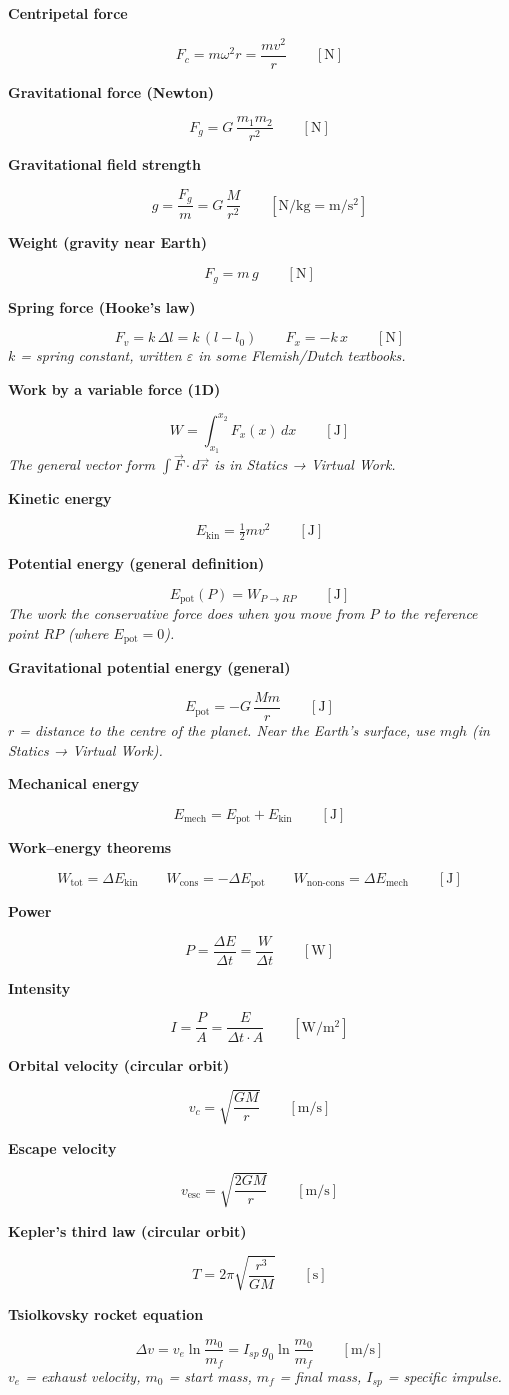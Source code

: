 \documentclass[11pt]{article}
\newcommand{\sub}[1]{\par\medskip\textbf{#1}\par}
\newcommand{\expl}[1]{{\color{gray}\itshape #1}\par}
\begin{document}
\sub{Centripetal force}
\[ F_c = m\omega^2 r = \frac{m v^2}{r} \qquad [\mathrm{N}] \]

\sub{Gravitational force (Newton)}
\[ F_g = G\,\frac{m_1 m_2}{r^2} \qquad [\mathrm{N}] \]

\sub{Gravitational field strength}
\[ g = \frac{F_g}{m} = G\,\frac{M}{r^2} \qquad [\mathrm{N/kg} = \mathrm{m/s^2}] \]

\sub{Weight (gravity near Earth)}
\[ F_g = m\,g \qquad [\mathrm{N}] \]

\sub{Spring force (Hooke's law)}
\[ F_v = k\,\Delta l = k\,(l - l_0) \qquad F_x = -k\,x \qquad [\mathrm{N}] \]
\expl{$k$ = spring constant, written $\varepsilon$ in some Flemish/Dutch textbooks.}

\sub{Work by a variable force (1D)}
\[ W = \int_{x_1}^{x_2} F_x(x)\,dx \qquad [\mathrm{J}] \]
\expl{The general vector form $\int \vec F \cdot d\vec r$ is in Statics → Virtual Work.}

\sub{Kinetic energy}
\[ E_{\text{kin}} = \tfrac{1}{2} m v^2 \qquad [\mathrm{J}] \]

\sub{Potential energy (general definition)}
\[ E_{\text{pot}}(P) = W_{P \to RP} \qquad [\mathrm{J}] \]
\expl{The work the conservative force does when you move from $P$ to the reference point $RP$ (where $E_{\text{pot}} = 0$).}

\sub{Gravitational potential energy (general)}
\[ E_{\text{pot}} = -G\,\frac{M m}{r} \qquad [\mathrm{J}] \]
\expl{$r$ = distance to the centre of the planet. Near the Earth's surface, use $mgh$ (in Statics → Virtual Work).}

\sub{Mechanical energy}
\[ E_{\text{mech}} = E_{\text{pot}} + E_{\text{kin}} \qquad [\mathrm{J}] \]

\sub{Work–energy theorems}
\[ W_{\text{tot}} = \Delta E_{\text{kin}} \qquad W_{\text{cons}} = -\Delta E_{\text{pot}} \qquad W_{\text{non-cons}} = \Delta E_{\text{mech}} \qquad [\mathrm{J}] \]

\sub{Power}
\[ P = \frac{\Delta E}{\Delta t} = \frac{W}{\Delta t} \qquad [\mathrm{W}] \]

\sub{Intensity}
\[ I = \frac{P}{A} = \frac{E}{\Delta t\cdot A} \qquad [\mathrm{W/m^2}] \]

\sub{Orbital velocity (circular orbit)}
\[ v_c = \sqrt{\frac{GM}{r}} \qquad [\mathrm{m/s}] \]

\sub{Escape velocity}
\[ v_{\text{esc}} = \sqrt{\frac{2GM}{r}} \qquad [\mathrm{m/s}] \]

\sub{Kepler's third law (circular orbit)}
\[ T = 2\pi\sqrt{\frac{r^3}{GM}} \qquad [\mathrm{s}] \]

\sub{Tsiolkovsky rocket equation}
\[ \Delta v = v_e \ln\frac{m_0}{m_f} = I_{sp}\,g_0 \ln\frac{m_0}{m_f} \qquad [\mathrm{m/s}] \]
\expl{$v_e$ = exhaust velocity, $m_0$ = start mass, $m_f$ = final mass, $I_{sp}$ = specific impulse.}
\end{document}
